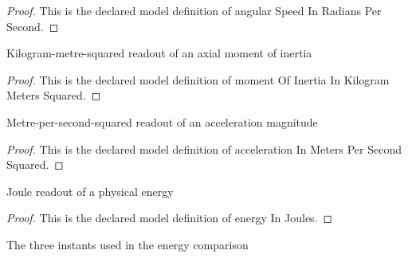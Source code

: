 \begin{proof}
  This is the declared model definition of angular Speed In Radians Per Second.
\end{proof}
\begin{definition}
  \label{def:physics:phyx-mini-0787:phyxminiproblems-problemphyxmini0787-momentofinertiainkilogrammeterssquared}
  Kilogram-metre-squared readout of an axial moment of inertia
\end{definition}
\begin{proof}
  This is the declared model definition of moment Of Inertia In Kilogram Meters Squared.
\end{proof}
\begin{definition}
  \label{def:physics:phyx-mini-0787:phyxminiproblems-problemphyxmini0787-accelerationinmeterspersecondsquared}
  Metre-per-second-squared readout of an acceleration magnitude
\end{definition}
\begin{proof}
  This is the declared model definition of acceleration In Meters Per Second Squared.
\end{proof}
\begin{definition}
  \label{def:physics:phyx-mini-0787:phyxminiproblems-problemphyxmini0787-energyinjoules}
  Joule readout of a physical energy
\end{definition}
\begin{proof}
  This is the declared model definition of energy In Joules.
\end{proof}
\begin{definition}
  \label{def:physics:phyx-mini-0787:phyxminiproblems-problemphyxmini0787-motionevent}
  The three instants used in the energy comparison
\end{definition}
